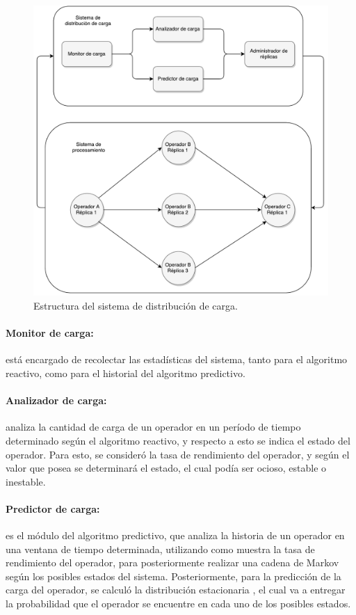 \begin{figure}[ht!]
  \centering
    \includegraphics[scale=0.5]{images/Diagrama.pdf}
  \caption{Estructura del sistema de distribución de carga.}
  \label{fig:componentesSistemas}
\end{figure}

\paragraph{Monitor de carga:} está encargado de recolectar las estadísticas del sistema, tanto para el algoritmo reactivo, como para el historial del algoritmo predictivo.

\paragraph{Analizador de carga:} analiza la cantidad de carga de un operador en un período de tiempo determinado según el algoritmo reactivo, y respecto a esto se indica el estado del operador. Para esto, se consideró la tasa de rendimiento del operador, y según el valor que posea se determinará el estado, el cual podía ser ocioso, estable o inestable.

\paragraph{Predictor de carga:} es el módulo del algoritmo predictivo, que analiza la historia de un operador en una ventana de tiempo determinada, utilizando como muestra la tasa de rendimiento del operador, para posteriormente realizar una cadena de Markov según los posibles estados del sistema. Posteriormente, para la predicción de la carga del operador, se calculó la distribución estacionaria \citep{Papoulis1984}, el cual va a entregar la probabilidad que el operador se encuentre en cada uno de los posibles estados.

